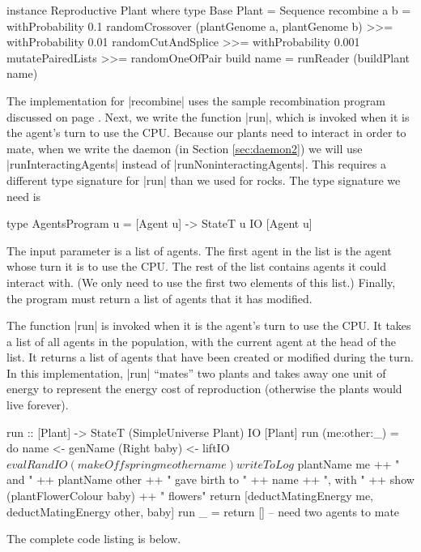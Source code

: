 \begin{code}
instance Reproductive Plant where
  type Base Plant = Sequence
  recombine a b = 
    withProbability 0.1 randomCrossover (plantGenome a, plantGenome b) >>=
    withProbability 0.01 randomCutAndSplice >>=
    withProbability 0.001 mutatePairedLists >>=
    randomOneOfPair
  build name = runReader (buildPlant name)
\end{code} 

The implementation for |recombine| uses the sample recombination
program discussed on page \pageref{code:recombination}.
Next, we write the function |run|, 
which is invoked when it is the agent's turn to use the CPU.
Because our plants need to interact in order to mate,
when we write the daemon (in Section \ref{sec:daemon2}) we will use
|runInteractingAgents| instead of |runNoninteractingAgents|.
This requires a different type signature for |run| than we used for
rocks.
The type signature we need is

\begin{code}
type AgentsProgram u = [Agent u] -> StateT u IO [Agent u]
\end{code} 

The input parameter is a list of agents. 
The first agent in the list is the agent whose turn it is to use the 
CPU.
The rest of the list contains agents it could interact with.
(We only need to use the first two elements of this list.)
Finally, the program must return a list of agents that it has modified.

The function |run| is invoked when it is the agent's turn to use the CPU.
It takes a list of all agents in the population, with the current agent at the head of the list.
It returns a list of agents that have been created or modified during the turn.
In this implementation, |run| ``mates'' two plants and takes away one unit of energy 
to represent the energy cost of reproduction
(otherwise the plants would live forever).

\begin{code}
run :: [Plant] -> StateT (SimpleUniverse Plant) IO [Plant]
run (me:other:_) = do
  name <- genName
  (Right baby) <- liftIO $ evalRandIO (makeOffspring me other name)
  writeToLog $ 
    plantName me ++ " and " ++ plantName other ++
      " gave birth to " ++ name ++ ", with " ++ 
       show (plantFlowerColour baby) ++ " flowers"
  return [deductMatingEnergy me, deductMatingEnergy other, baby]
run _ = return [] -- need two agents to mate
\end{code}

The complete code listing is below.
\label{code:plant}

